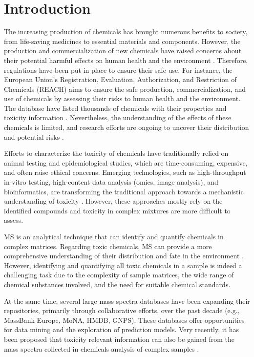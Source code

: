 \chapter{Introduction}

The increasing production of chemicals has brought numerous benefits to society, from life-saving medicines to essential materials and components. However, the production and commercialization of new chemicals have raised concerns about their potential harmful effects on human health and the environment \cite{Landrigan2018}. Therefore, regulations have been put in place to ensure their safe use. For instance, the European Union's Registration, Evaluation, Authorization, and Restriction of Chemicals (REACH) aims to ensure the safe production, commercialization, and use of chemicals by assessing their risks to human health and the environment. The database have listed thousands of chemicals with their properties and toxicity information \cite{ECHA}. Nevertheless, the understanding of the effects of these chemicals is limited, and research efforts are ongoing to uncover their distribution and potential risks \cite{Escher2020}\cite{Ebele2017}\cite{Sill2020}.

Efforts to characterize the toxicity of chemicals have traditionally relied on animal testing and epidemiological studies, which are time-consuming, expensive, and often raise ethical concerns. Emerging technologies, such as high-throughput in-vitro testing, high-content data analysis (omics, image analysis), and bioinformatics, are transforming the traditional approach towards a mechanistic understanding of toxicity \cite{Krewski2010}. However, these approaches mostly rely on the identified compounds and toxicity in complex mixtures are more difficult to assess.

\ac{MS} is an analytical technique that can identify and quantify chemicals in complex matrices. Regarding toxic chemicals, \ac{MS} can provide a more comprehensive understanding of their distribution and fate in the environment \cite{Richardson2011}. However, identifying and quantifying all toxic chemicals in a sample is indeed a challenging task \cite{rager_linking_2016} due to the complexity of sample matrices, the wide range of chemical substances involved, and the need for suitable chemical standards.


At the same time, several large mass spectra databases have been expanding their repositories, primarily through collaborative efforts, over the past decade (e.g., MassBank Europe\cite{Horai2010}, MoNA\cite{mona_website}, HMDB\cite{Wishart2017}, GNPS\cite{Wang2016}). These databases offer opportunities for data mining and the exploration of prediction models. Very recently, it has been proposed that toxicity relevant information can also be gained from the mass spectra collected in chemicals analysis of complex samples \cite{Zushi2022}\cite{peets_MS2tox_2022}. 

